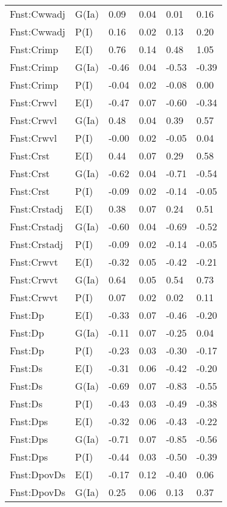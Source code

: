 \begin{center}
\begin{longtable}{|p{1.1in}|p{0.7in}|p{0.7in}|p{0.6in}|p{0.6in}|p{0.6in}|}
  Fnst:Cwwadj & G(Ia) & 0.09 & 0.04 & 0.01 & 0.16 \\ 
  Fnst:Cwwadj & P(I) & 0.16 & 0.02 & 0.13 & 0.20 \\ 
  Fnst:Crimp & E(I) & 0.76 & 0.14 & 0.48 & 1.05 \\ 
  Fnst:Crimp & G(Ia) & -0.46 & 0.04 & -0.53 & -0.39 \\ 
  Fnst:Crimp & P(I) & -0.04 & 0.02 & -0.08 & 0.00 \\ 
  Fnst:Crwvl & E(I) & -0.47 & 0.07 & -0.60 & -0.34 \\ 
  Fnst:Crwvl & G(Ia) & 0.48 & 0.04 & 0.39 & 0.57 \\ 
  Fnst:Crwvl & P(I) & -0.00 & 0.02 & -0.05 & 0.04 \\ 
  Fnst:Crst & E(I) & 0.44 & 0.07 & 0.29 & 0.58 \\ 
  Fnst:Crst & G(Ia) & -0.62 & 0.04 & -0.71 & -0.54 \\ 
  Fnst:Crst & P(I) & -0.09 & 0.02 & -0.14 & -0.05 \\ 
  Fnst:Crstadj & E(I) & 0.38 & 0.07 & 0.24 & 0.51 \\ 
  Fnst:Crstadj & G(Ia) & -0.60 & 0.04 & -0.69 & -0.52 \\ 
  Fnst:Crstadj & P(I) & -0.09 & 0.02 & -0.14 & -0.05 \\ 
  Fnst:Crwvt & E(I) & -0.32 & 0.05 & -0.42 & -0.21 \\ 
  Fnst:Crwvt & G(Ia) & 0.64 & 0.05 & 0.54 & 0.73 \\ 
  Fnst:Crwvt & P(I) & 0.07 & 0.02 & 0.02 & 0.11 \\ 
  Fnst:Dp & E(I) & -0.33 & 0.07 & -0.46 & -0.20 \\ 
  Fnst:Dp & G(Ia) & -0.11 & 0.07 & -0.25 & 0.04 \\ 
  Fnst:Dp & P(I) & -0.23 & 0.03 & -0.30 & -0.17 \\ 
  Fnst:Ds & E(I) & -0.31 & 0.06 & -0.42 & -0.20 \\ 
  Fnst:Ds & G(Ia) & -0.69 & 0.07 & -0.83 & -0.55 \\ 
  Fnst:Ds & P(I) & -0.43 & 0.03 & -0.49 & -0.38 \\ 
  Fnst:Dps & E(I) & -0.32 & 0.06 & -0.43 & -0.22 \\ 
  Fnst:Dps & G(Ia) & -0.71 & 0.07 & -0.85 & -0.56 \\ 
  Fnst:Dps & P(I) & -0.44 & 0.03 & -0.50 & -0.39 \\ 
  Fnst:DpovDs & E(I) & -0.17 & 0.12 & -0.40 & 0.06 \\ 
  Fnst:DpovDs & G(Ia) & 0.25 & 0.06 & 0.13 & 0.37 \\ 

\end{longtable}
\end{center}
